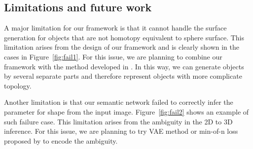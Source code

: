 \subsection{Limitations and future work}
A major limitation for our framework is that it cannot handle the surface generation for objects that are not homotopy equivalent to sphere surface. This limitation arises from the design of our framework and is clearly shown in the cases in Figure~\ref{fig:fail1}. For this issue, we are planning to combine our framework with the method developed in \cite{assemble}. In this way, we can generate objects by several separate parts and therefore represent objects with more complicate topology.

Another limitation is that our semantic network failed to correctly infer the parameter for shape from the input image. Figure~\ref{fig:fail2} shows an example of such failure case. This limitation arises from the ambiguity in the 2D to 3D inference. For this issue, we are planning to try VAE method\cite{VAE} or min-of-n loss proposed by \cite{PSGN} to encode the ambiguity.  

